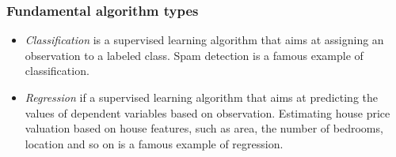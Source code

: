 \documentclass[pdftex,english,oribibl]{llncs}
\begin{document}
\subsubsection{Fundamental algorithm types\\}
\begin{itemize}
	\item \textit{Classification} is a supervised learning algorithm that aims at assigning an observation to 
	 a labeled class. Spam detection is a famous example of classification.
	 \item \textit{Regression} if a supervised learning algorithm that aims at predicting the values of dependent variables
	  based on observation. Estimating house price valuation based on house features, such as area,
the number of bedrooms, location and so on is a famous example of regression.
\end{itemize}
\begin{figure}[H]
\centering
{}
\end{figure}
\end{document}
